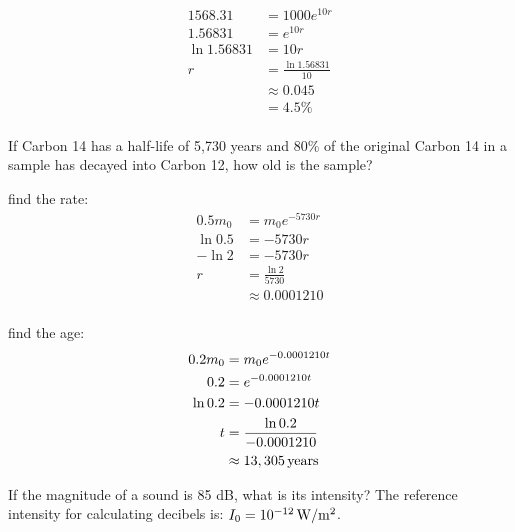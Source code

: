 \documentclass[fleqn,addpoints]{exam}
\begin{document}
\begin{questions}
      \begin{solution}
        \begin{align*}
          1568.31     & = 1000 e^{10 r} \\
          1.56831     & = e^{10 r} \\
          \ln 1.56831 & = 10 r \\
          r           & = \frac{\ln 1.56831}{10} \\
                      & \approx 0.045 \\
                      & = 4.5\% \\
        \end{align*}
      \end{solution}

    \question[10]
      If Carbon 14 has a half-life of 5,730 years and 80\% of the original Carbon 14 in a sample has decayed into Carbon
      12, how old is the sample?

      \begin{solution}
        find the rate:
        \begin{align*}
          0.5 m_0 & = m_0 e^{-5730r} \\
          \ln 0.5 & = -5730r \\
          - \ln 2 & = -5730r \\
          r       & = \frac{\ln 2}{5730} \\
                  & \approx 0.0001210 \\
        \end{align*}

        find the age:
        \begin{align*}
          0.2 m_0 & = m_0 e^{-0.0001210 t} \\
          0.2     & = e^{-0.0001210 t} \\
          \ln 0.2 & = -0.0001210 t \\
          t       & = \frac{\ln 0.2}{-0.0001210} \\
                  & \approx \unit[13,305]{years} \\
        \end{align*}
      \end{solution}

    \question[5]
      If the magnitude of a sound is 85 dB, what is its intensity?  The reference intensity for calculating decibels is:
      $I_0 = \unit[10^{-12}]{W/m^2}$.
      


\end{questions}
\end{document}
